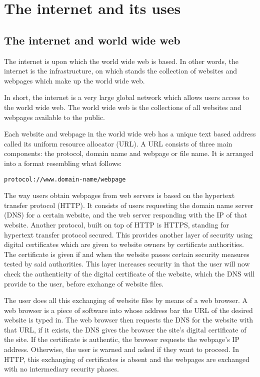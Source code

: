 \section{The internet and its uses}
\subsection{The internet and world wide web}

The internet is upon which the world wide web is based. In other words, the internet is the 
infrastructure, on which stands the collection of websites and webpages which make up the world
wide web.

In short, the internet is a very large global network which allows users access to the world wide
web. The world wide web is the collections of all websites and webpages available to the public.

Each website and webpage in the world wide web has a 
unique text based address called its uniform resource
allocator (URL). A URL consists of three main components: the protocol, domain name and webpage or
file name. It is arranged into a format resembling what follows:

\begin{center}
\begin{BVerbatim}
protocol://www.domain-name/webpage
\end{BVerbatim}
\end{center}
The way users obtain webpages from web servers is based on the hypertext transfer protocol (HTTP).
It consists of users requesting the domain name server (DNS) for a certain website, and the web 
server responding
with the IP of that website. Another protocol, built on top of HTTP is HTTPS, standing
for hypertext transfer protocol secured. This provides another layer of security using digital
certificates which are given to website owners by certificate authorities. The certificate is given
if and when the website passes certain security measures tested by said authorities. This layer
increases security in that the user will now check the authenticity of the digital certificate of
the website, which the DNS will provide to the user, before exchange of website files.

The user does all this exchanging of website files by means of a web browser. A web browser is a
piece of software into whose address bar the URL of the desired website is typed in. The web 
browser then requests the DNS for the website with that URL, if it exists, the 
DNS 
gives the browser the site's digital certificate of the site. If the certificate is authentic,
the browser requests the webpage's IP address. Otherwise, the user is warned and asked if they want
to proceed. In HTTP, this exchanging of certificates is absent and the webpages are exchanged
with no intermediary security phases.

